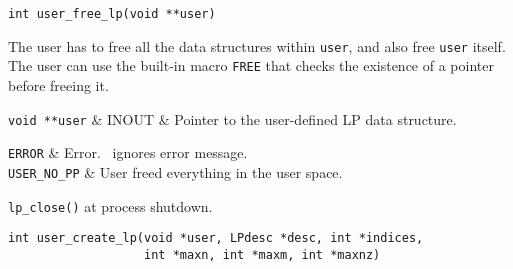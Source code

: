 \begin{verbatim}
int user_free_lp(void **user)
\end{verbatim}

\bd

\describe

The user has to free all the data structures within {\tt *user}, and also free
{\tt user} itself. The user can use the built-in macro {\tt FREE} that checks
the existence of a pointer before freeing it. 

\args

{\tt void **user} & INOUT & Pointer to the user-defined LP data structure. \\
\et

\returns

{\tt ERROR} & Error. \BB\ ignores error message. \\
{\tt USER\_NO\_PP} & User freed everything in the user space. \\
\et

\item[Wrapper invoked from:] {\tt lp\_close()} at process shutdown.

\ed

\vspace{1ex}


\begin{verbatim}
int user_create_lp(void *user, LPdesc *desc, int *indices, 
                   int *maxn, int *maxm, int *maxnz)
\end{verbatim}

\bd

\describe

